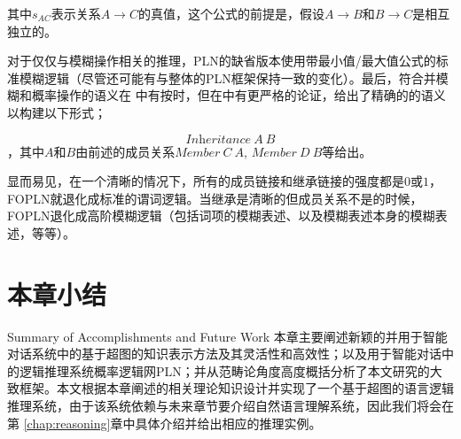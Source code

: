 其中$s_{AC}$表示关系$A\rightarrow C$的真值，这个公式的前提是，假设$A\rightarrow B$和$B\rightarrow C$是相互独立的。

对于仅仅与模糊操作相关的推理，PLN的缺省版本使用带最小值/最大值公式的标准模糊逻辑（尽管还可能有与整体的PLN框架保持一致的变化）。最后，符合并模糊和概率操作的语义在\cite{Goertzel2008} 中有按时，但在\cite{Goertzel2010e}中有更严格的论证，给出了精确的的语义以构建以下形式；

$$
\textit{Inheritance} \ A \  B
$$，其中$A$和$B$由前述的成员关系$\textit{Member}\ C\ A$, $\textit{Member}\ D\ B$等给出。

显而易见，在一个清晰的情况下，所有的成员链接和继承链接的强度都是$0$或$1$，FOPLN就退化成标准的谓词逻辑。当继承是清晰的但成员关系不是的时候，FOPLN退化成高阶模糊逻辑（包括词项的模糊表述、以及模糊表述本身的模糊表述，等等）。


\section{本章小结}{Summary of Accomplishments and Future Work}
本章主要阐述新颖的并用于智能对话系统中的基于超图的知识表示方法及其灵活性和高效性；以及用于智能对话中的逻辑推理系统概率逻辑网PLN；并从范畴论角度高度概括分析了本文研究的大致框架。本文根据本章阐述的相关理论知识设计并实现了一个基于超图的语言逻辑推理系统，由于该系统依赖与未来章节要介绍自然语言理解系统，因此我们将会在第 \ref{chap:reasoning}章中具体介绍并给出相应的推理实例。

